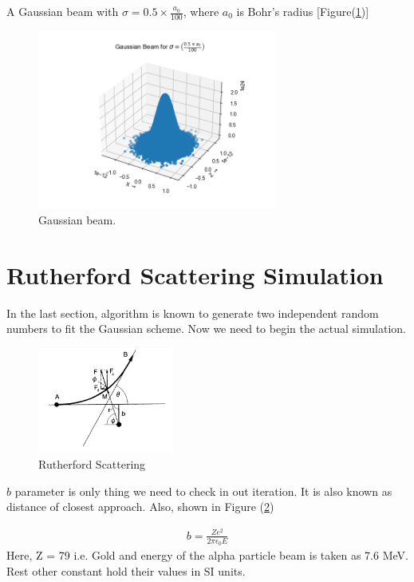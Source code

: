 \documentclass[11pt,a4paper]{article}
\begin{document}
A Gaussian beam with $\sigma = 0.5\times \frac{a_0}{100}$, where $a_0$ is Bohr's radius [Figure(\ref{fig_1})]

	\begin{figure}[H]
	\begin{center}
	\includegraphics[width=0.7\textwidth]{Figure_1.png}
	\caption{Gaussian beam.}
	\label{fig_1}
	\end{center}
	\end{figure}
	
\section{Rutherford Scattering Simulation}
In the last section, algorithm is known to generate two independent random numbers to fit the Gaussian scheme. Now we need to begin the actual simulation.

	\begin{figure}[H]
	\begin{center}
	\includegraphics[width=0.4\textwidth]{rf.png}
	\caption{Rutherford Scattering}
	\label{fig_3}
	\end{center}
	\end{figure}

$b$ parameter is only thing we need to check in out iteration. It is also known as distance of closest approach. Also, shown in Figure (\ref{fig_3})

\begin{align}\label{eq_2}
b = \frac{Ze^2}{2\pi\epsilon_0E}
\end{align}
Here, Z = 79 i.e. Gold and energy of the alpha particle beam is taken as 7.6 MeV. Rest other constant hold their values in SI units.\medskip
\end{document}
